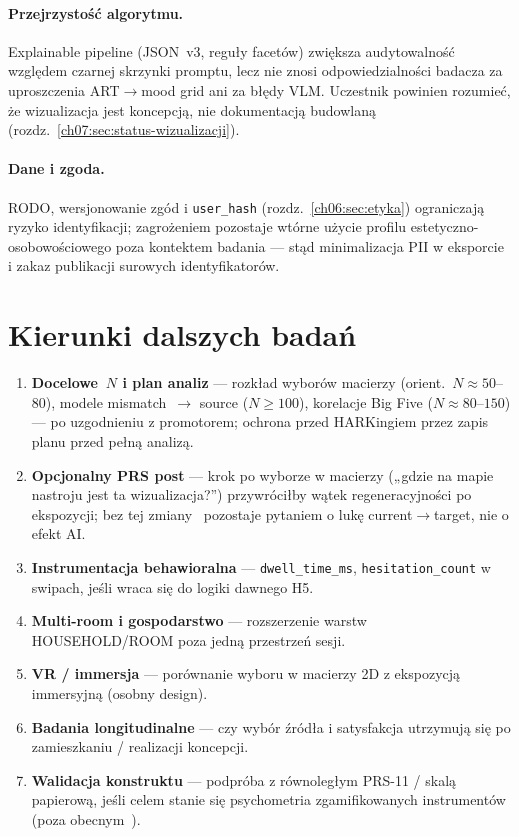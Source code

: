 \paragraph{Przejrzystość algorytmu.}
Explainable pipeline (JSON~v3, reguły facetów) zwiększa audytowalność względem czarnej skrzynki promptu, lecz nie znosi odpowiedzialności badacza za uproszczenia ART$\rightarrow$mood grid ani za błędy VLM.
Uczestnik powinien rozumieć, że wizualizacja jest koncepcją, nie dokumentacją budowlaną (rozdz.~\ref{ch07:sec:status-wizualizacji}).

\paragraph{Dane i zgoda.}
RODO, wersjonowanie zgód i \texttt{user\_hash} (rozdz.~\ref{ch06:sec:etyka}) ograniczają ryzyko identyfikacji; zagrożeniem pozostaje wtórne użycie profilu estetyczno-osobowościowego poza kontektem badania --- stąd minimalizacja PII w eksporcie i zakaz publikacji surowych identyfikatorów.

\section{Kierunki dalszych badań}
\label{ch09:sec:dalsze}

\begin{enumerate}
  \item \textbf{Docelowe~$N$ i plan analiz} --- rozkład wyborów macierzy (orient.\ $N\!\approx\!50$--$80$), modele mismatch~$\rightarrow$ source ($N\!\geq\!100$), korelacje Big Five ($N\!\approx\!80$--$150$) --- po uzgodnieniu z promotorem; ochrona przed HARKingiem przez zapis planu przed pełną analizą.
  \item \textbf{Opcjonalny PRS post} --- krok po wyborze w macierzy („gdzie na mapie nastroju jest ta wizualizacja?”) przywróciłby wątek regeneracyjności po ekspozycji; bez tej zmiany~ pozostaje pytaniem o lukę current$\rightarrow$target, nie o efekt AI.
  \item \textbf{Instrumentacja behawioralna} --- \texttt{dwell\_time\_ms}, \texttt{hesitation\_count} w swipach, jeśli wraca się do logiki dawnego H5.
  \item \textbf{Multi-room i gospodarstwo} --- rozszerzenie warstw HOUSEHOLD/ROOM poza jedną przestrzeń sesji.
  \item \textbf{VR / immersja} --- porównanie wyboru w macierzy 2D z ekspozycją immersyjną (osobny design).
  \item \textbf{Badania longitudinalne} --- czy wybór źródła i satysfakcja utrzymują się po zamieszkaniu / realizacji koncepcji.
  \item \textbf{Walidacja konstruktu} --- podpróba z równoległym PRS-11 / skalą papierową, jeśli celem stanie się psychometria zgamifikowanych instrumentów (poza obecnym~).
\end{enumerate}
